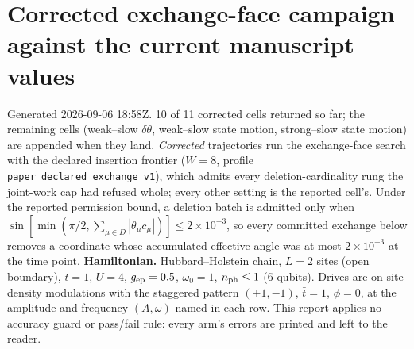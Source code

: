 \documentclass[10pt]{article}
\begin{document}
\section*{Corrected exchange-face campaign against the current manuscript values}
Generated 2026-09-06 18:58Z.  10 of 11 corrected cells returned so far; the remaining cells (weak--slow $\delta\theta$, weak--slow state motion, strong--slow state motion) are appended when they land.  \emph{Corrected} trajectories run the exchange-face search with the declared insertion frontier ($W=8$, profile \texttt{paper\_declared\_exchange\_v1}), which admits every deletion-cardinality rung the joint-work cap had refused whole; every other setting is the reported cell's.  Under the reported permission bound, a deletion batch is admitted only when $\sin[\min(\pi/2,\sum_{\mu\in D}|\theta_\mu c_\mu|)]\le2\times10^{-3}$, so every committed exchange below removes a coordinate whose accumulated effective angle was at most $2\times10^{-3}$ at the time point.
\textbf{Hamiltonian.} Hubbard--Holstein chain, $L=2$ sites (open boundary), $t=1$, $U=4$, $g_{\rm ep}=0.5$, $\omega_0=1$, $n_{\rm ph}\le1$ (6 qubits).  Drives are on-site-density modulations with the staggered pattern $(+1,-1)$, $\bar t=1$, $\phi=0$, at the amplitude and frequency $(A,\omega)$ named in each row.
This report applies no accuracy guard or pass/fail rule: every arm's errors are printed and left to the reader.
\end{document}
